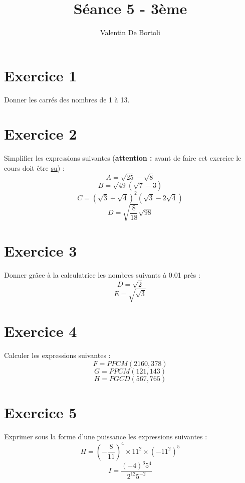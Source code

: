 \documentclass[10pt,a4paper]{article}
\title{Séance 5 - 3ème}
\author{Valentin De Bortoli}
\begin{document}
\maketitle
\section{Exercice 1}
Donner les carrés des nombres de 1 à 13.
\section{Exercice 2}
Simplifier les expressions suivantes (\textbf{attention :} avant de faire cet exercice le cours doit être \underline{su}) :
\begin{equation}
A=\sqrt{25}-\sqrt{8}
\end{equation}
\begin{equation}
B=\sqrt{49}(\sqrt{7}-3)
\end{equation}
\begin{equation}
C=(\sqrt{3}+\sqrt{4})^2(\sqrt{3}-2\sqrt{4})
\end{equation}
\begin{equation}
D=\sqrt{\frac{8}{18}}\sqrt{98}
\end{equation}
\section{Exercice 3}
Donner grâce à la calculatrice les nombres suivants à 0.01 près :
\begin{equation}
D=\sqrt{2}
\end{equation}
\begin{equation}
E=\sqrt{\sqrt{3}}
\end{equation}
\section{Exercice 4}
Calculer les expressions suivantes :
\begin{equation}
F=PPCM(2160,378)
\end{equation}
\begin{equation}
G=PPCM(121,143)
\end{equation}
\begin{equation}
H=PGCD(567,765)
\end{equation}
\section{Exercice 5}
Exprimer sous la forme d'une puissance les expressions suivantes :
\begin{equation}
H=\left(-\frac{8}{11}\right)^4\times 11^2 \times (-11^2)^5
\end{equation}
\begin{equation}
I=\frac{(-4)^6 5^4}{2^{12} 5^{-2}}
\end{equation}
\end{document}

